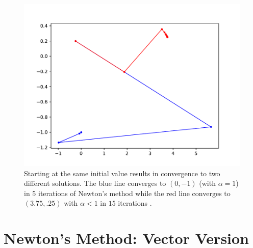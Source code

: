 \clearpage

\begin{figure}
\centering
\includegraphics[width=.8\textwidth]{figures/backtracking.pdf}
\caption{Starting at the same initial value results in convergence to two different solutions.  The blue line converges to $(0,-1)$ (with $\alpha = 1$) in 5 iterations of Newton's method while the red line converges to $(3.75,.25)$ with $\alpha < 1$ in $15$ iterations .}
\label{fig:contour_plot}
\end{figure}

\section*{Newton's Method: Vector Version}

